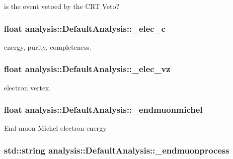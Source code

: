is the event vetoed by the C\-R\-T Veto? \hypertarget{classanalysis_1_1DefaultAnalysis_a5ce51cfe745fbf0327541a1877a99f87}{
\subsubsection[{\-\_\-elec\-\_\-c}]{\setlength{\rightskip}{0pt plus 5cm}float analysis\-::\-Default\-Analysis\-::\-\_\-elec\-\_\-c\hspace{0.3cm}{\ttfamily [private]}}}\label{classanalysis_1_1DefaultAnalysis_a5ce51cfe745fbf0327541a1877a99f87}
energy, purity, completeness. \hypertarget{classanalysis_1_1DefaultAnalysis_ad728b8375e4d62c128d767fcebbab1d9}{
\subsubsection[{\-\_\-elec\-\_\-vz}]{\setlength{\rightskip}{0pt plus 5cm}float analysis\-::\-Default\-Analysis\-::\-\_\-elec\-\_\-vz\hspace{0.3cm}{\ttfamily [private]}}}\label{classanalysis_1_1DefaultAnalysis_ad728b8375e4d62c128d767fcebbab1d9}
electron vertex. \hypertarget{classanalysis_1_1DefaultAnalysis_a3797bcb310074825add03ce03175fdc3}{
\subsubsection[{\-\_\-endmuonmichel}]{\setlength{\rightskip}{0pt plus 5cm}float analysis\-::\-Default\-Analysis\-::\-\_\-endmuonmichel\hspace{0.3cm}{\ttfamily [private]}}}\label{classanalysis_1_1DefaultAnalysis_a3797bcb310074825add03ce03175fdc3}
End muon Michel electron energy \hypertarget{classanalysis_1_1DefaultAnalysis_a8cbb24a231e167258d2914f92bc4af22}{
\subsubsection[{\-\_\-endmuonprocess}]{\setlength{\rightskip}{0pt plus 5cm}std\-::string analysis\-::\-Default\-Analysis\-::\-\_\-endmuonprocess\hspace{0.3cm}{\ttfamily [private]}}}\label{classanalysis_1_1DefaultAnalysis_a8cbb24a231e167258d2914f92bc4af22}
